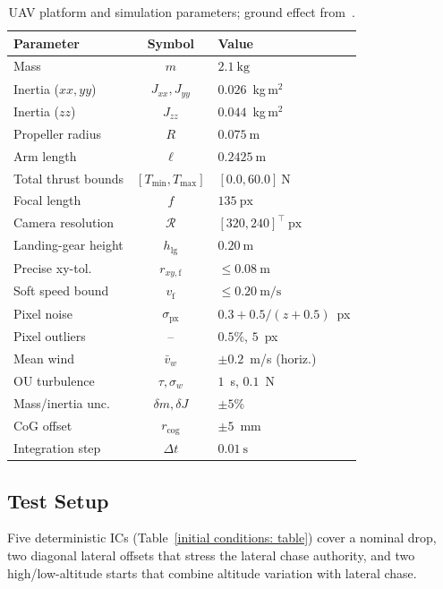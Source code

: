 \documentclass{IEEEtaes}
\begin{document}
\begin{table}[!t]
\centering
\caption{UAV platform and simulation parameters; ground effect from~\cite{sanchez-cuevas2017}.}
\label{uav params: table}
\begin{tabular}{lcl}
\toprule
\textbf{Parameter} & \textbf{Symbol} & \textbf{Value} \\
\midrule
Mass                & $m$                    & $2.1~\text{kg}$ \\
Inertia ($xx,yy$)    & $J_{xx},J_{yy}$        & $0.026$~kg\,m$^2$ \\
Inertia ($zz$)        & $J_{zz}$               & $0.044$~kg\,m$^2$ \\
Propeller radius    & $R$                    & $0.075~\text{m}$ \\
Arm length          & $\ell$                 & $0.2425~\text{m}$ \\
Total thrust bounds & $[T_{\min},T_{\max}]$  & $[0.0,60.0]~\text{N}$ \\
Focal length        & $f$                    & $135~\text{px}$ \\
Camera resolution   & $\mathcal{R}$          & $[320,240]^\top~\text{px}$ \\
Landing-gear height & $h_\text{lg}$ & $0.20~\text{m}$ \\
Precise xy-tol.     & $r_{xy,\text{f}}$ & $\le 0.08~\text{m}$ \\
Soft speed bound    & $v_\text{f}$      & $\le 0.20~\text{m/s}$ \\
Pixel noise          & $\sigma_\text{px}$     & $0.3{+}0.5/(z{+}0.5)$~px \\
Pixel outliers       & --                     & $0.5\%$, $5$~px \\
Mean wind            & $\bar{v}_w$            & $\pm 0.2$~m/s (horiz.) \\
OU turbulence        & $\tau,\sigma_w$        & $1$~s, $0.1$~N \\
Mass/inertia unc.    & $\delta m,\delta J$    & $\pm 5\%$ \\
CoG offset           & $r_\text{cog}$         & $\pm 5$~mm \\
Integration step    & $\Delta t$             & $0.01~\text{s}$ \\
\bottomrule
\end{tabular}
\end{table}

\subsection{Test Setup}
\label{test conditions: subsec}
Five deterministic ICs (Table~\ref{initial conditions: table}) cover a nominal drop, two diagonal lateral offsets that stress the lateral chase authority, and two high/low-altitude starts that combine altitude variation with lateral chase.
\end{document}
